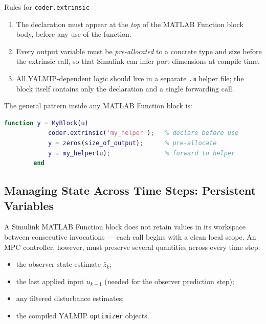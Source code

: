 \begin{notebox}{Rules for \texttt{coder.extrinsic}}
	\begin{enumerate}[noitemsep]
		\item The declaration must appear at the \emph{top} of the MATLAB
		Function block body, before any use of the function.
		\item Every output variable must be \emph{pre-allocated} to a
		concrete type and size before the extrinsic call, so that
		Simulink can infer port dimensions at compile time.
		\item All YALMIP-dependent logic should live in a separate
		\texttt{.m} helper file; the block itself contains only the
		declaration and a single forwarding call.
	\end{enumerate}
	
	The general pattern inside any MATLAB Function block is:
	
	\begin{lstlisting}[language=Matlab]
		function y = MyBlock(u)
			coder.extrinsic('my_helper');   % declare before use
			y = zeros(size_of_output);      % pre-allocate
			y = my_helper(u);               % forward to helper
		end
	\end{lstlisting}
\end{notebox}

\subsection{Managing State Across Time Steps: Persistent Variables}
\label{subsec:persistent}

A Simulink MATLAB Function block does not retain values in its
workspace between consecutive invocations — each call begins with a
clean local scope.  An MPC controller, however, must preserve several
quantities across every time step:

\begin{itemize}[noitemsep]
	\item the observer state estimate $\hat{z}_k$;
	\item the last applied input $u_{k-1}$ (needed for the observer
	prediction step);
	\item any filtered disturbance estimates;
	\item the compiled YALMIP \texttt{optimizer} objects.
\end{itemize}

